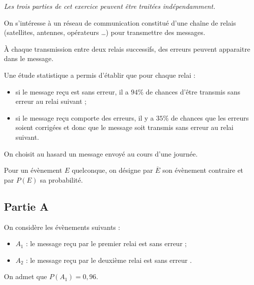 \emph{Les trois parties de cet exercice peuvent être traitées indépendamment.}

	\medskip

	On s'intéresse à un réseau de communication constitué d'une chaîne de relais (satellites, antennes, opérateurs \dots) pour transmettre des messages.

	\smallskip

	À chaque transmission entre deux relais successifs, des erreurs peuvent apparaitre dans le message.

	Une étude statistique a permis d'établir que pour chaque relai :
	\begin{itemize}[topsep=0pt]
		\item si le message reçu est sans erreur, il a $94 \%$ de chances d'être transmis sans erreur au relai suivant ;
		\item si le message reçu comporte des erreurs, il y a $35 \%$ de chances que les erreurs soient corrigées et donc que le message soit transmis sans erreur au relai suivant.
	\end{itemize}

	\smallskip

	On choisit au hasard un message envoyé au cours d'une journée.

	\smallskip

	Pour un évènement $E$ quelconque, on désigne par $\overline{E}$ son évènement contraire et par $P(E)$ sa probabilité.

	\subsection*{Partie A}
		On considère les évènements suivants :

		\begin{itemize}[leftmargin=10mm]
			\item $A_{1}$ : \og le message reçu par le premier relai est sans erreur \fg{} ;
			\item $A_{2}$ : \og le message reçu par le deuxième relai est sans erreur \fg{}.
		\end{itemize}

		On admet que $P\left(A_{1}\right)=0,96$.

		\medskip

